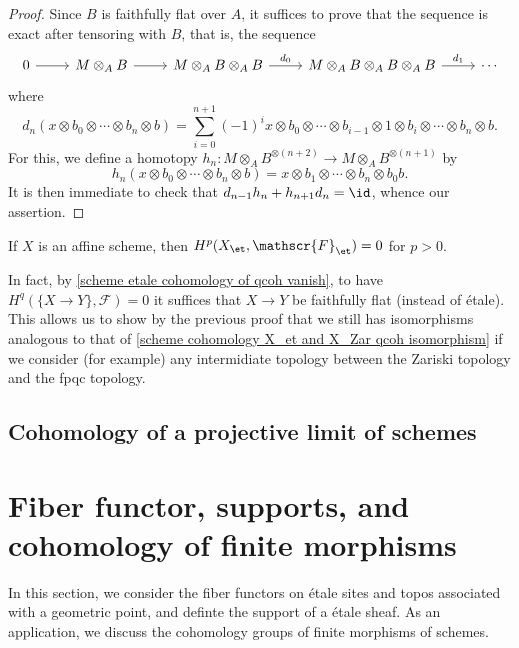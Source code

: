 \begin{proof}
Since $B$ is faithfully flat over $A$, it suffices to prove that the sequence is exact after tensoring with $B$, that is, the sequence
\[\begin{tikzcd}
0\ar[r]&M\otimes_AB\ar[r]&M\otimes_AB\otimes_AB\ar[r,"d_0"]&M\otimes_AB\otimes_AB\otimes_AB\ar[r,"d_1"]&\cdots
\end{tikzcd}\]
where
\[d_n(x\otimes b_0\otimes\cdots\otimes b_n\otimes b)=\sum_{i=0}^{n+1}(-1)^ix\otimes b_0\otimes\cdots\otimes b_{i-1}\otimes 1\otimes b_i\otimes\cdots\otimes b_n\otimes b.\]
For this, we define a homotopy $h_n:M\otimes_AB^{\otimes(n+2)}\to M\otimes_AB^{\otimes(n+1)}$ by
\[h_n(x\otimes b_0\otimes\cdots\otimes b_n\otimes b)=x\otimes b_1\otimes\cdots\otimes b_n\otimes b_0b.\]
It is then immediate to check that $d_{n-1}h_n+h_{n+1}d_n=\id$, whence our assertion.
\end{proof}

\begin{corollary}\label{scheme affine cohomology X_et qcoh zero}
If $X$ is an affine scheme, then $H^p(X_\et,\mathscr{F}_\et)=0$ for $p>0$.
\end{corollary}

\begin{remark}
In fact, by \cref{scheme etale cohomology of qcoh vanish}, to have $H^q(\{X\to Y\},\mathscr{F})=0$ it suffices that $X\to Y$ be faithfully flat (instead of \'etale). This allows us to show by the previous proof that we still has isomorphisms analogous to that of \cref{scheme cohomology X_et and X_Zar qcoh isomorphism} if we consider (for example) any intermidiate topology between the Zariski topology and the fpqc topology.
\end{remark}

\subsection{Cohomology of a projective limit of schemes}\label{scheme etale cohomology of projective system}

\section{Fiber functor, supports, and cohomology of finite morphisms}
In this section, we consider the fiber functors on \'etale sites and topos associated with a geometric point, and definte the support of a \'etale sheaf. As an application, we discuss the cohomology groups of finite morphisms of schemes.

